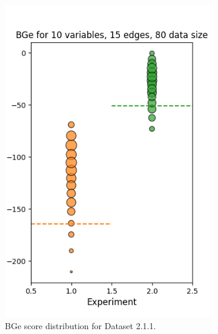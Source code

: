 \documentclass{lxaiproposal}
\begin{document}
    \begin{figure}[h]
        \centering
        \begin{subfigure}{0.32\textwidth}
            \centering
            \includegraphics[width=\textwidth]{figures/BGe_10_15_80}
            \caption{BGe score distribution for Dataset 2.1.1.}
            \label{fig:bge_score_10_15_80}
        \end{subfigure}
        \begin{subfigure}{0.32\textwidth}
            \centering

\end{subfigure}
\end{figure}
\end{document}
